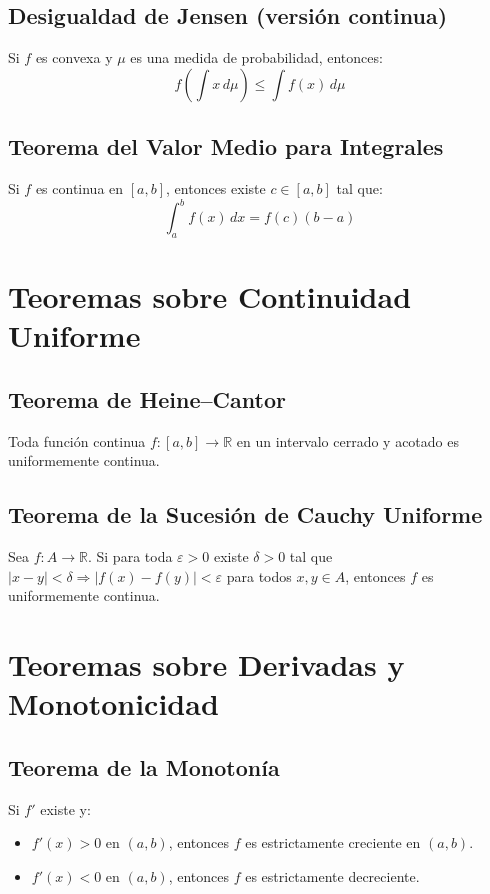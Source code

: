 \documentclass[12pt]{article}
\begin{document}
\subsection{Desigualdad de Jensen (versión continua)}
Si $f$ es convexa y $\mu$ es una medida de probabilidad, entonces:
\[
f\left( \int x\,d\mu \right) \leq \int f(x)\,d\mu
\]

\subsection{Teorema del Valor Medio para Integrales}
Si $f$ es continua en $[a,b]$, entonces existe $c \in [a,b]$ tal que:
\[
\int_a^b f(x)\,dx = f(c)(b-a)
\]


\newpage

\section{Teoremas sobre Continuidad Uniforme}

\subsection{Teorema de Heine–Cantor}
Toda función continua $f: [a,b] \rightarrow \mathbb{R}$ en un intervalo cerrado y acotado es uniformemente continua.

\subsection{Teorema de la Sucesión de Cauchy Uniforme}
Sea $f: A \rightarrow \mathbb{R}$. Si para toda $\varepsilon > 0$ existe $\delta > 0$ tal que $|x - y| < \delta \Rightarrow |f(x) - f(y)| < \varepsilon$ para todos $x, y \in A$, entonces $f$ es uniformemente continua.

\section{Teoremas sobre Derivadas y Monotonicidad}

\subsection{Teorema de la Monotonía}
Si $f'$ existe y:
\begin{itemize}
  \item $f'(x) > 0$ en $(a,b)$, entonces $f$ es estrictamente creciente en $(a,b)$.
  \item $f'(x) < 0$ en $(a,b)$, entonces $f$ es estrictamente decreciente.
\end{itemize}
\end{document}
